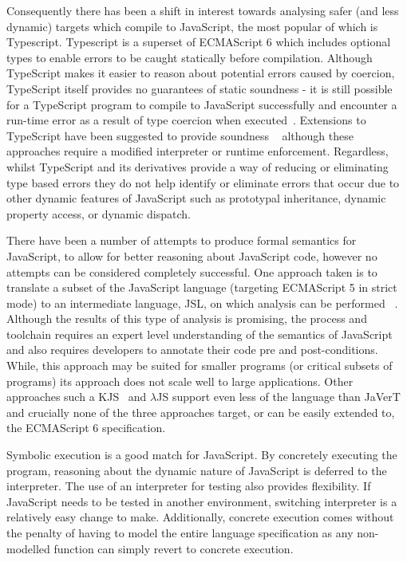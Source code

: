 \documentclass[]{final_report}
\begin{document}
Consequently there has been a shift in interest towards analysing safer (and less dynamic) targets which compile to JavaScript, the most popular of which is Typescript. Typescript is a superset of ECMAScript 6 which includes optional types to enable errors to be caught statically before compilation. Although TypeScript makes it easier to reason about potential errors caused by coercion, TypeScript itself provides no guarantees of static soundness - it is still possible for a TypeScript program to compile to JavaScript successfully and encounter a run-time error as a result of type coercion when executed~\cite{bierman2014understanding}. Extensions to TypeScript have been suggested to provide soundness ~\cite{richards2015concrete, rastogi2015safe} although these approaches require a modified interpreter or runtime enforcement. Regardless, whilst TypeScript and its derivatives provide a way of reducing or eliminating type based errors they do not help identify or eliminate errors that occur due to other dynamic features of JavaScript such as prototypal inheritance, dynamic property access, or dynamic dispatch.

There have been a number of attempts to produce formal semantics for JavaScript, to allow for better reasoning about JavaScript code, however no attempts can be considered completely successful. One approach taken is to translate a subset of the JavaScript language (targeting ECMAScript 5 in strict mode) to an intermediate language, JSL, on which analysis can be performed ~\cite{gardner2012towards}. Although the results of this type of analysis is promising, the process and toolchain requires an expert level understanding of the semantics of JavaScript and also requires developers to annotate their code pre and post-conditions. While, this approach may be suited for smaller programs (or critical subsets of programs) its approach does not scale well to large applications. Other approaches such a KJS~\cite{park2015kjs} and \ensuremath{\lambda}JS\cite{guha2010essence} support even less of the language than JaVerT and crucially none of the three approaches target, or can be easily extended to, the ECMAScript 6 specification.

Symbolic execution is a good match for JavaScript. By concretely executing the program, reasoning about the dynamic nature of JavaScript is deferred to the interpreter. The use of an interpreter for testing also provides flexibility. If JavaScript needs to be tested in another environment, switching interpreter is a relatively easy change to make. Additionally, concrete execution comes without the penalty of having to model the entire language specification as any non-modelled function can simply revert to concrete execution.
\end{document}
